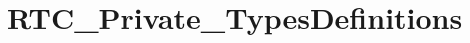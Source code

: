 \hypertarget{group___r_t_c___private___types_definitions}{\section{R\-T\-C\-\_\-\-Private\-\_\-\-Types\-Definitions}
\label{group___r_t_c___private___types_definitions}
}
